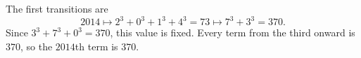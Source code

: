 The first transitions are
\[
2014\longmapsto2^3+0^3+1^3+4^3=73
\longmapsto7^3+3^3=370.
\]
Since $3^3+7^3+0^3=370$, this value is fixed. Every term from the third onward is $370$, so the $2014$th term is $\boxed{370}$.
